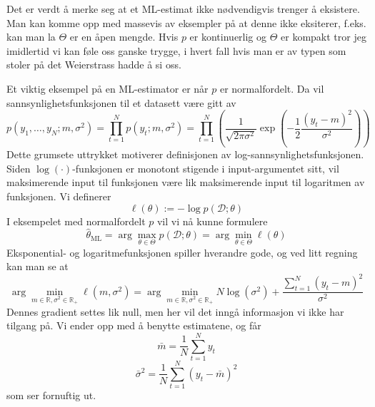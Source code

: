 \documentclass[12pt]{article}
\begin{document}
Det er verdt å merke seg at et ML-estimat ikke nødvendigvis trenger å eksistere. Man kan komme opp med massevis av eksempler på at denne ikke eksiterer, f.eks. kan man la $\Theta$ er en åpen mengde. Hvis $p$ er kontinuerlig og $\Theta$ er kompakt tror jeg imidlertid vi kan føle oss ganske trygge, i hvert fall hvis man er av typen som stoler på det Weierstrass hadde å si oss.

Et viktig eksempel på en ML-estimator er når $p$ er normalfordelt. Da vil sannsynlighetsfunksjonen til et datasett være gitt av
\begin{equation}
p\left(y_{1}, \ldots, y_{N} ; m, \sigma^{2}\right)=\prod_{t=1}^{N} p\left(y_{t} ; m, \sigma^{2}\right)=\prod_{t=1}^{N}\left(\frac{1}{\sqrt{2 \pi \sigma^{2}}} \exp \left(-\frac{1}{2} \frac{\left(y_{t}-m\right)^{2}}{\sigma^{2}}\right)\right)
\end{equation}
Dette grumsete uttrykket motiverer definisjonen av log-sannsynlighetsfunksjonen. Siden $\log(\cdot)$-funksjonen er monotont stigende i input-argumentet sitt, vil maksimerende input til funksjonen være lik maksimerende input til logaritmen av funksjonen. Vi definerer
\begin{equation}
\ell(\theta):=-\log p(\mathcal{D} ; \theta)
\end{equation}
I eksempelet med normalfordelt $p$ vil vi nå kunne formulere
\begin{equation}
\widehat{\theta}_{\mathrm{ML}}=\arg \max _{\theta \in \Theta} p(\mathcal{D} ; \theta) = \arg \min _{\theta \in \Theta} \ell(\theta)
\end{equation}
Eksponential- og logaritmefunksjonen spiller hverandre gode, og ved litt regning kan man se at
\begin{equation}
\arg \min _{m \in \mathbb{R}, \sigma^{2} \in \mathbb{R}_{+}} \ell\left(m, \sigma^{2}\right)=\arg \min _{m \in \mathbb{R}, \sigma^{2} \in \mathbb{R}_{+}} N \log \left(\sigma^{2}\right)+\frac{\sum_{t=1}^{N}\left(y_{t}-m\right)^{2}}{\sigma^{2}}
\end{equation}
Dennes gradient settes lik null, men her vil det inngå informasjon vi ikke har tilgang på. Vi ender opp med å benytte estimatene, og får
\begin{equation}
\bar{m}=\frac{1}{N} \sum_{t=1}^{N} y_{t}
\end{equation}
\begin{equation}
\bar{\sigma}^{2}=\frac{1}{N} \sum_{t=1}^{N}\left(y_{t}-\bar{m}\right)^{2}
\end{equation}
som ser fornuftig ut.
\end{document}
